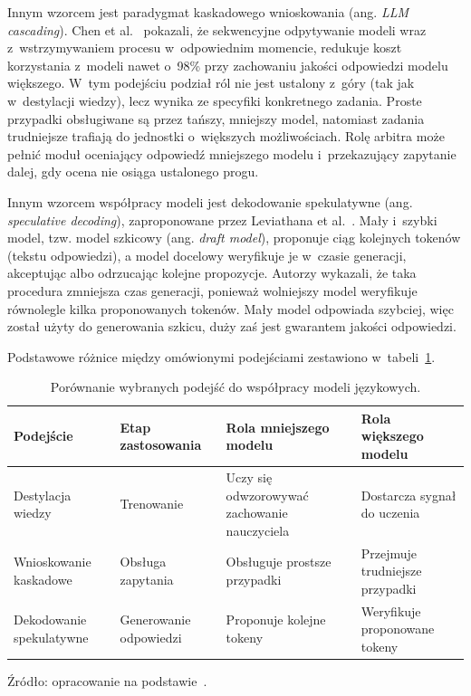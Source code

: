 Innym wzorcem jest paradygmat kaskadowego wnioskowania (ang. \emph{LLM cascading}). Chen et al.~\cite{Chen2023FrugalGPT} pokazali, że sekwencyjne odpytywanie modeli wraz z~wstrzymywaniem procesu w~odpowiednim momencie, redukuje koszt korzystania z~modeli nawet o~98\% przy zachowaniu jakości odpowiedzi modelu większego. W~tym podejściu podział ról nie jest ustalony z~góry (tak jak w~destylacji wiedzy), lecz wynika ze specyfiki konkretnego zadania. Proste przypadki obsługiwane są przez tańszy, mniejszy model, natomiast zadania trudniejsze trafiają do jednostki o~większych możliwościach. Rolę arbitra może pełnić moduł oceniający odpowiedź mniejszego modelu i~przekazujący zapytanie dalej, gdy ocena nie osiąga ustalonego progu.

Innym wzorcem współpracy modeli jest dekodowanie spekulatywne (ang. \emph{speculative decoding}), zaproponowane przez Leviathana et al.~\cite{Leviathan2023}. Mały i~szybki model, tzw. model szkicowy (ang. \emph{draft model}), proponuje ciąg kolejnych tokenów (tekstu odpowiedzi), a model docelowy weryfikuje je w~czasie generacji, akceptując albo odrzucając kolejne propozycje. Autorzy wykazali, że taka procedura zmniejsza czas generacji, ponieważ wolniejszy model weryfikuje równolegle kilka proponowanych tokenów. Mały model odpowiada szybciej, więc został użyty do generowania szkicu, duży zaś jest gwarantem jakości odpowiedzi.

Podstawowe różnice między omówionymi podejściami zestawiono w~tabeli~\ref{tab:wspolpraca_modeli}.

\begin{table}[H]
  \centering
  \caption{Porównanie wybranych podejść do współpracy modeli językowych.}
  \label{tab:wspolpraca_modeli}
  \begingroup
  \small
  \renewcommand{\arraystretch}{1.2}
  \begin{tabular}{@{}>{\raggedright\arraybackslash}p{}>{\raggedright\arraybackslash}p{}>{\raggedright\arraybackslash}p{}>{\raggedright\arraybackslash}p{}@{}}
    \hline
    Podejście & Etap zastosowania & Rola mniejszego modelu & Rola większego modelu \\
    \hline
    Destylacja wiedzy & Trenowanie & Uczy się odwzorowywać zachowanie nauczyciela & Dostarcza sygnał do uczenia \\
    Wnioskowanie kaskadowe & Obsługa zapytania & Obsługuje prostsze przypadki & Przejmuje trudniejsze przypadki \\
    Dekodowanie spekulatywne & Generowanie odpowiedzi & Proponuje kolejne tokeny & Weryfikuje proponowane tokeny \\
    \hline
  \end{tabular}
  \par\smallskip
  Źródło: opracowanie na podstawie~\cite{Hinton2015,Chen2023FrugalGPT,Leviathan2023}.
  \endgroup
\end{table}

